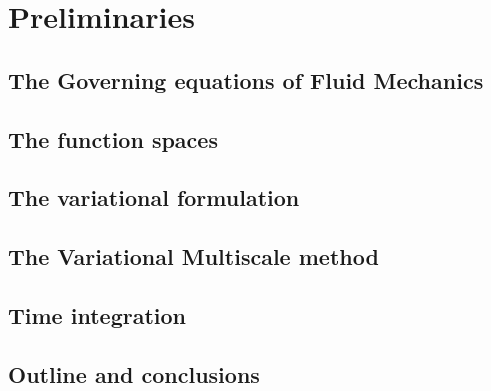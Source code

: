 
\chapter{Preliminaries}
\label{chap-Preliminaries}


\newcommand{\keyword}[1]{\textbf{#1}}
\newcommand{\tabhead}[1]{\textbf{#1}}
\newcommand{\code}[1]{\texttt{#1}}
\newcommand{\file}[1]{\texttt{\bfseries#1}}
\newcommand{\option}[1]{\texttt{\itshape#1}}


\section{The Governing equations of Fluid Mechanics}


\section{The function spaces}


\section{The variational formulation}


\section{The Variational Multiscale method}
\label{sec-vms}


\section{Time integration}
\label{sec-time_integration}



\section{Outline and conclusions}
